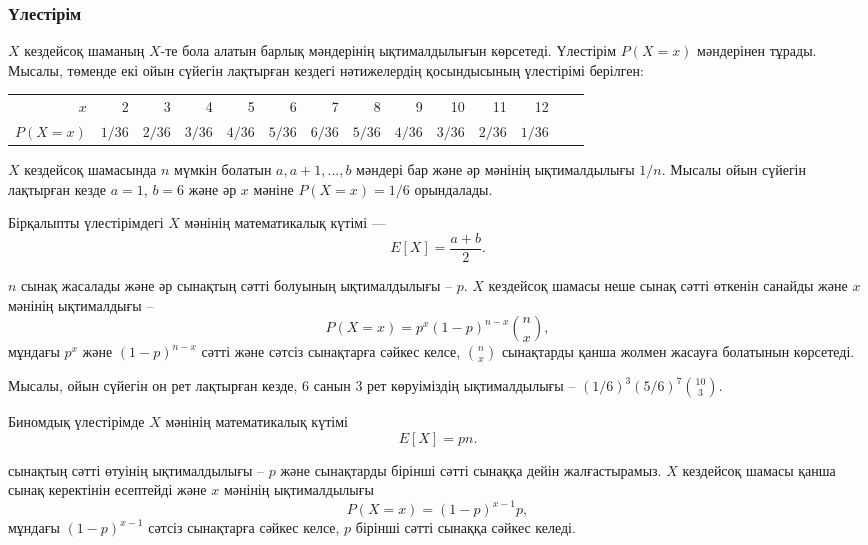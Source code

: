 \subsubsection{Үлестірім}


$X$ кездейсоқ шаманың 
$X$-те бола алатын барлық мәндерінің ықтималдылығын
көрсетеді. Үлестірім $P(X=x)$ мәндерінен тұрады. 
Мысалы, төменде екі ойын сүйегін лақтырған кездегі 
нәтижелердің қосындысының үлестірімі берілген:
\begin{center}
\small {
\begin{tabular}{r|rrrrrrrrrrrrr}
$x$ & 2 & 3 & 4 & 5 & 6 & 7 & 8 & 9 & 10 & 11 & 12 \\
$P(X=x)$ & $1/36$ & $2/36$ & $3/36$ & $4/36$ & $5/36$ & $6/36$ & $5/36$ & $4/36$ & $3/36$ & $2/36$ & $1/36$ \\
\end{tabular}
}
\end{center}


 $X$ кездейсоқ шамасында 
$n$ мүмкін болатын $a,a+1,\ldots,b$ мәндері бар және әр мәнінің 
ықтималдылығы $1/n$. Мысалы ойын сүйегін лақтырған кезде 
$a=1$, $b=6$ және әр $x$ мәніне $P(X=x)=1/6$ орындалады.

Бірқалыпты үлестірімдегі $X$ мәнінің математикалық күтімі ––
\[E[X] = \frac{a+b}{2}.\]

 $n$ сынақ жасалады
және әр сынақтың сәтті болуының ықтималдылығы -- $p$. 
$X$ кездейсоқ шамасы неше сынақ сәтті өткенін 
санайды және $x$ мәнінің ықтималдығы --
\[P(X=x)=p^x (1-p)^{n-x} {n \choose x},\]
мұндағы $p^x$ және $(1-p)^{n-x}$ сәтті және сәтсіз 
сынақтарға сәйкес келсе, ${n \choose x}$ сынақтарды 
қанша жолмен жасауға болатынын көрсетеді. 

Мысалы, ойын сүйегін он рет лақтырған кезде, 
6 санын 3 рет көруіміздің ықтималдылығы  --
$(1/6)^3 (5/6)^7 {10 \choose 3}$.

Биномдық үлестірімде $X$ мәнінің математикалық күтімі 
\[E[X] = pn.\]

сынақтың сәтті өтуінің ықтималдылығы -- $p$
және сынақтарды бірінші сәтті сынаққа дейін жалғастырамыз.
$X$ кездейсоқ шамасы қанша сынақ керектінін есептейді
және $x$ мәнінің ықтималдылығы 
\[P(X=x)=(1-p)^{x-1} p,\]
мұндағы $(1-p)^{x-1}$ сәтсіз сынақтарға сәйкес келсе,
$p$ бірінші сәтті сынаққа сәйкес келеді. 

